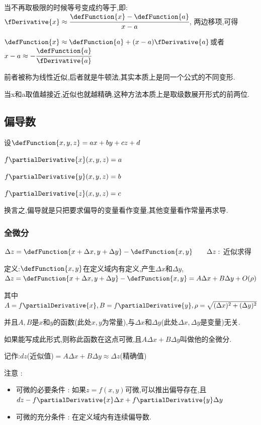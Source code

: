 {{{    当不再取极限的时候等号变成约等于,即:$\fDerivative{x} \approx \cfrac{\defFunction{x} - \defFunction{a}}{x - a}$, 两边移项,可得

    $\defFunction{x} \approx \defFunction{a} + (x-a)\fDerivative{a}$或者$x - a \approx -\cfrac{\defFunction{a}}{\fDerivative{a}}$

    前者被称为线性近似,后者就是牛顿法,其实本质上是同一个公式的不同变形.

    当x和a取值越接近,近似也就越精确,这种方法本质上是取级数展开形式的前两位.

  }%

  \subsection{偏导数}{

    设$\defFunction{x,y,z} = ax + by + cz + d$

    $f\partialDerivative{x}(x,y,z) = a$

    $f\partialDerivative{y}(x,y,z) = b$

    $f\partialDerivative{z}(x,y,z) = c$

    换言之,偏导就是只把要求偏导的变量看作变量,其他变量看作常量再求导.

    \subsubsection{全微分}{

      $\Delta z = \defFunction{x + \Delta x,y + \Delta y} - \defFunction{x,y}\qquad\Delta z : $ 近似求得

      定义:$\defFunction{x,y}$在定义域内有定义,产生$\Delta x$和$\Delta y$,$\Delta z = \defFunction{x + \Delta x,y + \Delta y} - \defFunction{x,y} = A\Delta x + B\Delta y + O(\rho)$

      其中$A = f\partialDerivative{x}, B = f\partialDerivative{y}, \rho = \sqrt{(\Delta x)^2 + (\Delta y)^2}$

      并且$A,B$是$x$和$y$的函数(此处$x,y$为常量),与$\Delta x$和$\Delta y$(此处$\Delta x, \Delta y$是变量)无关.

      如果能写成此形式,则称此函数在这点可微,且$A\Delta x + B\Delta y$叫做他的全微分.

      记作:$dz$(近似值)$= A\Delta x + B\Delta y \approx \Delta z$(精确值)

      注意 :

      \begin{itemize}
        \item 可微的必要条件 : 如果$z = f(x,y)$可微,可以推出偏导存在,且$dz - f\partialDerivative{x}\Delta x + f\partialDerivative{y}\Delta y$
        \item 可微的充分条件 : 在定义域内有连续偏导数.
      \end{itemize}
    }

}}}
